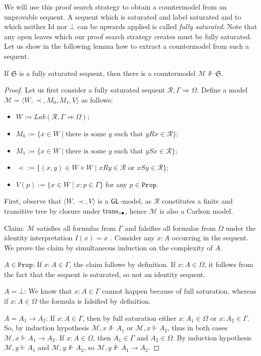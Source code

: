 \documentclass[runningheads,orivec]{llncs}
\newcommand{\GL}{\textnormal{\textsf{GL}}}
\newcommand{\transBi}{\textnormal{trans}_{\circ \bullet}}
\newcommand{\Ra}{\Rightarrow}
\newcommand{\la}{\langle}
\newcommand{\ra}{\rangle}
\newcommand{\spa}{\;|\;}
\newcommand{\R}{\mathcal{R}}
\newcommand{\Mw}{\mathcal{M}}
\newcommand{\Seq}{\mathfrak{S}}
\newcommand{\Prop}{\mathtt{Prop}}
\begin{document}
We will use this proof search strategy to obtain a countermodel from an unprovable sequent. 
A sequent which is saturated and label saturated and to which neither Id nor $\bot$ can be upwards applied is called \emph{fully saturated}. Note that any open leaves which our proof search strategy creates must be fully saturated. Let us show in the following lemma how to extract a countermodel from such a sequent.

\begin{lemma} \label{lem:fulsat}
    If $\Seq$ is a fully saturated sequent, then there is a countermodel ${\Mw \nVdash \Seq}$. 
\end{lemma}
\begin{proof}
    Let us first consider a fully saturated sequent $\R , \Gamma \Ra \Omega$.
    Define a model $\Mw = \la W , \prec , M_0 , M_1 , V \ra$ as follows: 
    \begin{itemize}
        \item[] $W := Lab ( \R , \Gamma \Ra \Omega)$;
        \item[] $M_{0} := \{ x \in W \spa \text{there is some } y \text{ such that } yRx \in \R \}$;
        \item[] $M_{1}:= \{ x \in W \spa \text{there is some } y \text{ such that } ySx \in \R \}$;
        \item[] ${\prec} := \{ (x,y) \in W \times W \spa xRy \in \R \text{ or } xSy \in \R \}$;
        \item[] $V(p) := \{ x \in W \spa x : p \in \Gamma \}$ for any $p \in \Prop$.
    \end{itemize}
    First, observe that $\la W , \prec, V \ra$ is a $\GL$-model, as $\R$ constitutes a finite and transitive tree by closure under $\transBi$, hence $\Mw$ is also a Carlson model. 
    
    Claim: $\Mw$ satisfies all formulas from $\Gamma$ and falsifies all formulas from $\Omega$ under the identity interpretation  $I(x)=x$ . 
    Consider any $x:A$ occurring in the sequent. We prove the claim by simultaneous induction on the complexity of $A$. 
    
    $A \in \Prop$: If $x:A \in \Gamma $, the claim follows by definition. If $x:A \in \Omega$, it follows from the fact that the sequent is saturated, so not an identity sequent. 
    
    $A=\bot$: We know that $x:A \in \Gamma$ cannot happen because of full saturation, whereas if $x:A \in \Omega$ the formula is falsified by definition.
    
    $A= A_1 \to A_2$: If $x:A \in \Gamma$, then by full saturation either $x: A_1 \in \Omega$ or $x:A_2 \in \Gamma$. So, by induction hypothesis $\Mw , x \nVdash A_1$ or $\Mw , x \Vdash A_2$, thus in both cases $\Mw , x\Vdash A_1 \to A_2$. If $x:A \in \Omega$, then $A_1 \in \Gamma$ and $A_2 \in \Omega$. By induction hypothesis $\Mw , y \Vdash A_1$ and $\Mw ,y \nVdash A_2$, so $\Mw ,y \nVdash A_1 \to A_2$.
    

\end{proof}
\end{document}
